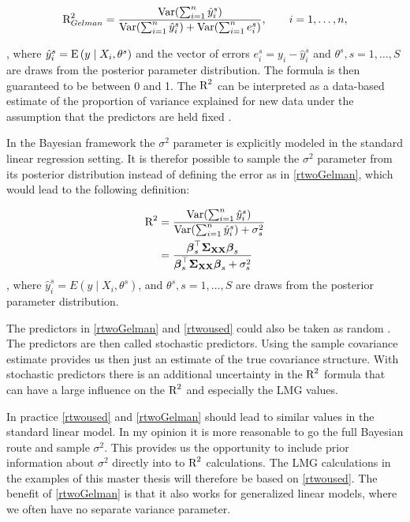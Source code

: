 \documentclass[11pt,a4paper,twoside]{book}
\begin{document}
      \begin{align} 
       \text{R}^2_{Gelman} = \frac{\operatorname{Var}(\sum_{i=1}^{n}\hat{y}^s_{i})}{\operatorname{Var}(\sum_{i=1}^{n}\hat{y}^s_{i})+\operatorname{Var}(\sum_{i=1}^{n}e^s_{i})}, \qquad i = 1,\dots,n, \label{rtwoGelman} 
   \end{align} 
   
, where $\hat{y}^s_{i}  = \operatorname{E} \left({y \mid X_{i}, \theta^s}\right) $ and the vector of errors $e^s_{i} = y_{i} - \hat{y}^s_{i}$ and $\theta^s, s = 1,\dotsc, S$ are draws from the posterior parameter distribution. The formula is then guaranteed to be between 0 and 1. The $\text{R}^2$ can  be interpreted as a data-based estimate of the proportion of variance explained for new data under the assumption that the predictors are held fixed \citep{Gelman2017}.

In the Bayesian framework the $\sigma^2$ parameter is explicitly modeled in the standard linear regression setting. It is therefor possible to sample the $\sigma^2$ parameter from its posterior distribution instead of defining the error as in \eqref{rtwoGelman}, which would lead to the following definition:

    \begin{align} 
        \text{R}^2 &= \frac{\operatorname{Var}(\sum_{i=1}^{n}\hat{y}^s_{i})}{\operatorname{Var}(\sum_{i=1}^{n}\hat{y}^s_{i})+\sigma_{s}^2} \\ &= \frac{{\boldsymbol{\beta}}_{s}^\top {\boldsymbol{\Sigma}}{}_{{\mathbf{X}} {\mathbf{X}}}  {\boldsymbol{\beta}}_{s}}{{\boldsymbol{\beta}}_{s}^\top {\boldsymbol{\Sigma}}{}_{{\mathbf{X}} {\mathbf{X}}}  {\boldsymbol{\beta}}_{s}+\sigma_{s}^2}\label{rtwoused} 
   \end{align} 
 , where $\hat{y}^s_{i}  = E \left({y \mid X_{i}, \theta^s}\right) $,  and $\theta^s, s = 1,\dotsc, S$ are draws from the posterior parameter distribution.


The predictors in \eqref{rtwoGelman} and \eqref{rtwoused} could also be taken as random \citep{Gelman2017}. The predictors are then called stochastic predictors. Using the sample covariance estimate provides us then just an estimate of the true covariance structure. With stochastic predictors there is an additional uncertainty in the $\text{R}^2$ formula that can have a large influence on the $\text{R}^2$ and especially the LMG values.

In practice \eqref{rtwoused} and \eqref{rtwoGelman} should lead to  similar values in the standard linear model. In my opinion it is more reasonable to go the full Bayesian route and sample  $\sigma^2$. This provides us the opportunity to include prior information about $\sigma^2$ directly into to $\text{R}^2$ calculations. The LMG calculations in the examples of this master thesis will therefore be based on \eqref{rtwoused}.  The benefit of \eqref{rtwoGelman} is that it also works for generalized linear models, where we often have no separate variance parameter.
\end{document}
